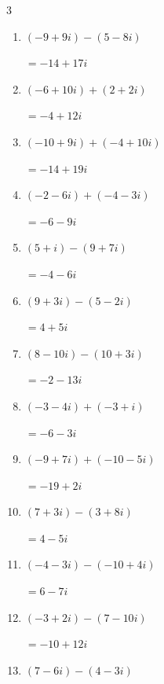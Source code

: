 \begin{multicols}{3}
\begin{enumerate}
        $\displaystyle =10+8i$

  \item $\displaystyle (-9+9i) - (5-8i)$

        $\displaystyle =-14+17i$

  \item $\displaystyle (-6+10i) + (2+2i)$

        $\displaystyle =-4+12i$

\columnbreak %

\resetques

  \item $\displaystyle (-10+9i) + (-4+10i)$

        $\displaystyle =-14+19i$

  \item $\displaystyle (-2-6i) + (-4-3i)$

        $\displaystyle =-6-9i$

  \item $\displaystyle (5+i) - (9+7i)$

        $\displaystyle =-4-6i$

  \item $\displaystyle (9+3i) - (5-2i)$

        $\displaystyle =4+5i$

  \item $\displaystyle (8-10i) - (10+3i)$

        $\displaystyle =-2-13i$

  \item $\displaystyle (-3-4i) + (-3+i)$

        $\displaystyle =-6-3i$

  \item $\displaystyle (-9+7i) + (-10-5i)$

        $\displaystyle =-19+2i$

  \item $\displaystyle (7+3i) - (3+8i)$

        $\displaystyle =4-5i$

  \item $\displaystyle (-4-3i) - (-10+4i)$

        $\displaystyle =6-7i$

  \item $\displaystyle (-3+2i) - (7-10i)$

        $\displaystyle =-10+12i$

  \item $\displaystyle (7-6i) - (4-3i)$


\end{enumerate}
\end{multicols}
